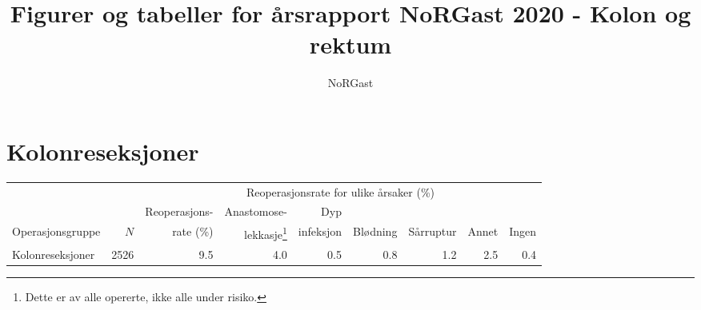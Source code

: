 \documentclass[norsk,a4paper]{article}\usepackage[]{graphicx}\usepackage[]{color}
\title{Figurer og tabeller for årsrapport NoRGast 2020 - Kolon og rektum}
\author{NoRGast}
\makeatletter
\newenvironment{kframe}{%
 \def\at@end@of@kframe{}%
 \ifinner\ifhmode%
  \def\at@end@of@kframe{\end{minipage}}%
  \begin{minipage}{\columnwidth}%
 \fi\fi%
 \def\FrameCommand##1{\hskip\@totalleftmargin \hskip-\fboxsep
 \colorbox{shadecolor}{##1}\hskip-\fboxsep
     \hskip-\linewidth \hskip-\@totalleftmargin \hskip\columnwidth}%
 \MakeFramed {\advance\hsize-\width
   \@totalleftmargin\z@ \linewidth\hsize
   \@setminipage}}%
 {\par\unskip\endMakeFramed%
 \at@end@of@kframe}
\makeatother
\begin{document}
\maketitle


\clearpage



\section{Kolonreseksjoner}

\begin{table}[htb]
\begin{minipage}{\textwidth}
\centering
\begin{kframe}


{\ttfamily\noindent\bfseries{}}\end{kframe}%
\begin{tabular}{lrrrrrrrr}
  \toprule
  & & & \multicolumn{4}{c}{Reoperasjonsrate for ulike årsaker (\%)} \\
 \cline{4-9} 
 & & Reoperasjons- & Anastomose- & Dyp &&&&  \\
 Operasjonsgruppe & $N$ & rate (\%) & lekkasje\footnote[2]{Dette er av alle opererte, ikke
alle under risiko.} & infeksjon & Blødning & Sårruptur & Annet & Ingen \\
 \midrule
Kolonreseksjoner & 2526 & 9.5 & 4.0 & 0.5 & 0.8 & 1.2 & 2.5 & 0.4 \\ 
   \bottomrule
\end{tabular}

\end{minipage}
\end{table}

\end{document}
